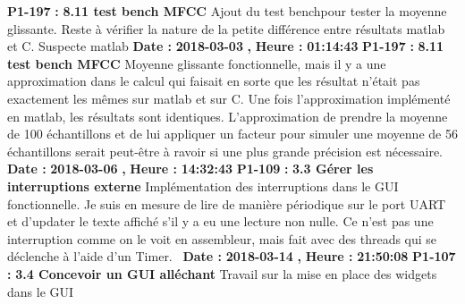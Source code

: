\documentclass{article}%
\begin{document}
\newline%
%
\textbf{P1{-}197 }%
\textbf{ : }%
\textbf{ 8.11 test bench MFCC}%
\newline%
\newline%
%
Ajout du test benchpour tester la moyenne glissante. Reste à vérifier la nature de la petite différence entre résultats matlab et C.\newline%
Suspecte matlab\newline%
\newline%
%
\textbf{Date : }%
\textbf{2018{-}03{-}03}%
\textbf{,}%
\textbf{ Heure : }%
\textbf{01:14:43}%
\newline%
%
\textbf{P1{-}197 }%
\textbf{ : }%
\textbf{ 8.11 test bench MFCC}%
\newline%
\newline%
%
Moyenne glissante fonctionnelle, mais il y a une approximation dans le calcul qui faisait en sorte que les résultat n'était pas exactement les mêmes sur matlab et sur C. Une fois l'approximation implémenté en matlab, les résultats sont identiques. L'approximation de prendre la moyenne de 100 échantillons et de lui appliquer un facteur pour simuler une moyenne de 56 échantillons serait peut{-}être à ravoir si une plus grande précision est nécessaire.~\newline%
\newline%
%
\textbf{Date : }%
\textbf{2018{-}03{-}06}%
\textbf{,}%
\textbf{ Heure : }%
\textbf{14:32:43}%
\newline%
%
\textbf{P1{-}109 }%
\textbf{ : }%
\textbf{ 3.3 Gérer les interruptions externe }%
\newline%
\newline%
%
Implémentation des interruptions dans le GUI fonctionnelle. Je suis en mesure de lire de manière périodique sur le port UART et d'updater le texte affiché s'il y a eu une lecture non nulle. Ce n'est pas une interruption comme on le voit en assembleur, mais fait avec des threads qui se déclenche à l'aide d'un Timer.~\newline%
\newline%
%
\textbf{Date : }%
\textbf{2018{-}03{-}14}%
\textbf{,}%
\textbf{ Heure : }%
\textbf{21:50:08}%
\newline%
%
\textbf{P1{-}107 }%
\textbf{ : }%
\textbf{ 3.4 Concevoir un GUI alléchant}%
\newline%
\newline%
%
Travail sur la mise en place des widgets dans le GUI\newline%
~\newline%
\end{document}
